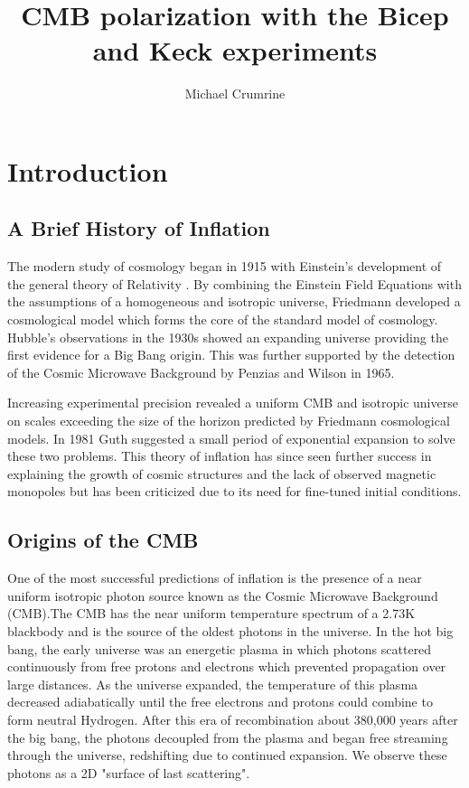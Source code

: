 \documentclass[12pt]{article}
\begin{document}
\author{Michael Crumrine}
\title{CMB polarization with the Bicep and Keck experiments}
\maketitle



\section{Introduction}

\subsection{A Brief History of Inflation}
The modern study of cosmology began in 1915 with Einstein's development of the general
theory of Relativity \cite{cite:Einstein}. By combining the Einstein Field
Equations with the assumptions of a homogeneous and isotropic universe,
Friedmann developed a cosmological model which forms the core of the standard
model of cosmology\cite{cite:Friedmann}. Hubble's observations in the 1930s
showed an expanding universe\cite{cite:Hubble} providing the first evidence
for a Big Bang origin. This was further supported by the detection of the
Cosmic Microwave Background by Penzias and Wilson in 1965\cite{cite:Penzias}.


Increasing experimental precision revealed a uniform CMB and isotropic
universe on scales exceeding the size of the horizon predicted by
Friedmann cosmological models. In 1981 Guth suggested a small period of
exponential expansion to solve these two problems. This theory of inflation
has since seen further success in explaining the growth of cosmic structures
and the lack of observed magnetic monopoles but has been criticized due to its
need for fine-tuned initial conditions.


\subsection{Origins of the CMB}
One of the most successful predictions of inflation is the presence of a near
uniform isotropic photon source known as the Cosmic Microwave Background
(CMB).The CMB has the near uniform temperature spectrum of a 2.73K blackbody
and is the source of the oldest photons in the universe. In the hot big bang, the
early universe was an energetic plasma in which photons scattered continuously
from free protons and electrons which prevented propagation over large
distances. As the universe expanded, the temperature of this plasma decreased
adiabatically until the free electrons and protons could combine to form
neutral Hydrogen. After this era of recombination about 380,000 years after
the big bang, the photons decoupled from the plasma and began free streaming
through the universe, redshifting due to continued expansion. We observe
these photons as a 2D "surface of last scattering". 
\end{document}

